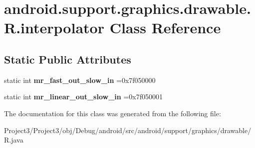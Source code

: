 \hypertarget{classandroid_1_1support_1_1graphics_1_1drawable_1_1R_1_1interpolator}{}\section{android.\+support.\+graphics.\+drawable.\+R.\+interpolator Class Reference}
\label{classandroid_1_1support_1_1graphics_1_1drawable_1_1R_1_1interpolator}
\subsection*{Static Public Attributes}
\begin{DoxyCompactItemize}
\item 
\mbox{\label{classandroid_1_1support_1_1graphics_1_1drawable_1_1R_1_1interpolator_a82ebc6705c3bdcb0dbb70c4948aa2b6a}} 
static int {\bfseries mr\+\_\+fast\+\_\+out\+\_\+slow\+\_\+in} =0x7f050000
\item 
\mbox{\label{classandroid_1_1support_1_1graphics_1_1drawable_1_1R_1_1interpolator_a0136bfd4f5e49b01ebb24d7512917e45}} 
static int {\bfseries mr\+\_\+linear\+\_\+out\+\_\+slow\+\_\+in} =0x7f050001
\end{DoxyCompactItemize}


The documentation for this class was generated from the following file\+:\begin{DoxyCompactItemize}
\item 
Project3/\+Project3/obj/\+Debug/android/src/android/support/graphics/drawable/R.\+java\end{DoxyCompactItemize}
